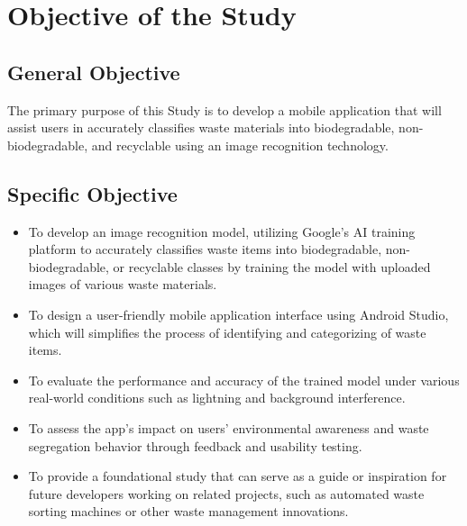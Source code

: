 \section{Objective of the Study}

\subsection{General Objective}
The primary purpose of this Study is to develop a mobile application that will assist users in accurately classifies waste materials into biodegradable, non-biodegradable, and recyclable using an image recognition technology.

\subsection{Specific Objective}
\begin{itemize}
	\item To develop an image recognition model, utilizing Google's AI training platform to accurately classifies waste items into biodegradable, non-biodegradable, or recyclable classes by training the model with uploaded images of various waste materials.
	
	\item To design a user-friendly mobile application interface using Android Studio, which will simplifies the process of identifying and categorizing of waste items.
	
	\item To evaluate the performance and accuracy of the trained model under various real-world conditions such as lightning and background interference.
	
	\item To assess the app's impact on users' environmental awareness and waste segregation behavior through feedback and usability testing.
	
	\item To provide a foundational study that can serve as a guide or inspiration for future developers working on related projects, such as automated waste sorting machines or other waste management innovations.
\end{itemize}